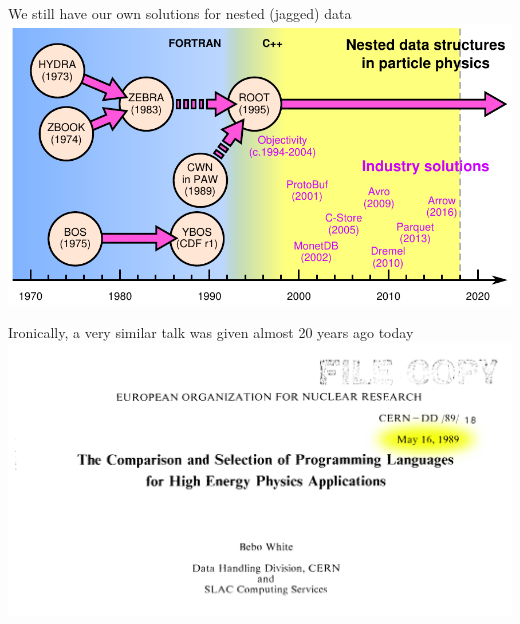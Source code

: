 \documentclass[aspectratio=169]{beamer}
\begin{document}
\begin{frame}{We still have our own solutions for nested (jagged) data}
\vspace{0.25 cm}
\includegraphics[width=\linewidth]{history.pdf}
\end{frame}

\begin{frame}{Ironically, a very similar talk was given almost 20 years ago today}
\vspace{0.25 cm}
\includegraphics[width=\linewidth]{bebo-white-title-page.png}
\end{frame}




\end{document}

